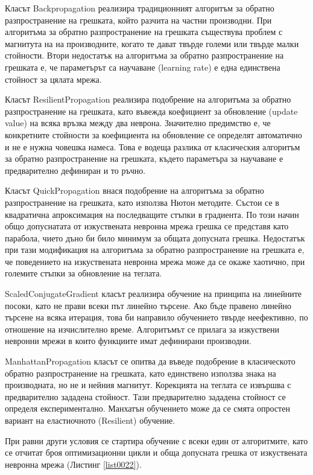 Класът Backpropagation реализира традиционният алгоритъм за обратно разпространение на грешката, който разчита на частни производни. При алгоритъма за обратно разпространение на грешката съществува проблем с магнитута на на производните, когато те дават твърде големи или твърде малки стойности. Втори недостатък на алгоритъма за обратно разпространение на грешката е, че параметърът са научаване (learning rate) е една единствена стойност за цялата мрежа. 

Класът ResilientPropagation реализира подобрение на алгоритъма за обратно разпространение на грешката, като въвежда коефициент за обновление (update value) на всяка връзка между два неврона. Значително предимство е, че конкретните стойности за коефициента на обновление се определят автоматично и не е нужна човешка намеса. Това е водеща разлика от класическия алгоритъм за обратно разпространение на грешката, където параметъра за научаване е предварително дефиниран и то ръчно. 

Класът QuickPropagation внася подобрение на алгоритъма за обратно разпространение на грешката, като използва Нютон методите. Състои се в квадратична апроксимация на последващите стъпки в градиента. По този начин общо допуснатата от изкуствената невронна мрежа грешка се представя като парабола, чието дъно би било минимум за общата допусната грешка. Недостатък при тази модификация на алгоритъма за обратно разпространение на грешката е, че поведението на изкуствената невронна мрежа може да се окаже хаотично, при големите стъпки за обновление на теглата. 

ScaledConjugateGradient класът реализира обучение на принципа на линейните посоки, като не прави всеки път линейно търсене. Ако бъде правено линейно търсене на всяка итерация, това би направило обучението твърде неефективно, по отношение на изчислително време. Алгоритъмът се прилага за изкуствени невронни мрежи в които функциите имат дефинирани производни. 

ManhattanPropagation класът се опитва да въведе подобрение в класическото обратно разпространение на грешката, като единствено използва знака на производната, но не и нейния магнитут. Корекцията на теглата се извършва с предварително зададена стойност. Тази предварително зададена стойност се определя експериментално. Манхатън обучението може да се смята опростен вариант на еластиочното (Resilient) обучение.

При равни други условия се стартира обучение с всеки един от алгоритмите, като се отчитат броя оптимизационни цикли и обща допусната грешка от изкуствената невронна мрежа (Листинг \ref{list0022}).

